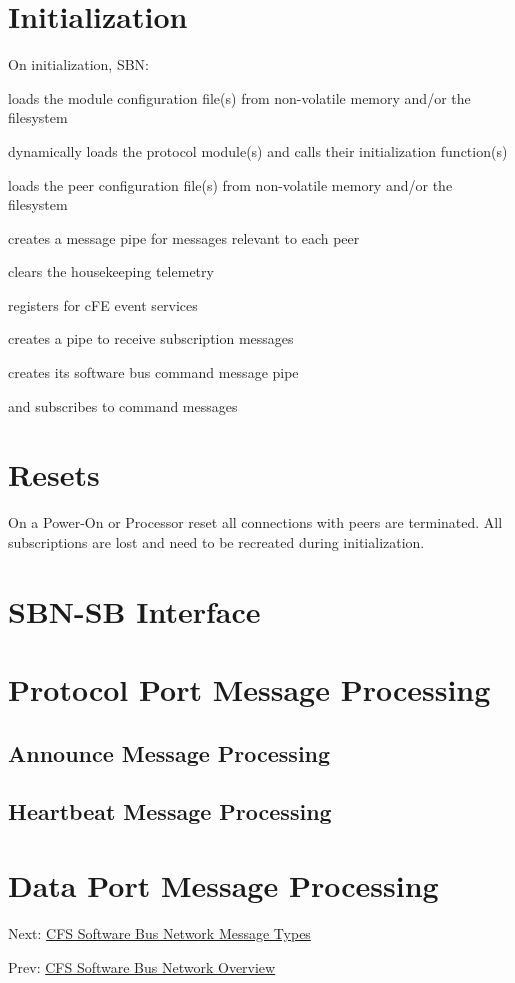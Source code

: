 \section*{Initialization }

On initialization, S\-B\-N\-: 
\begin{DoxyEnumerate}
\item loads the module configuration file(s) from non-\/volatile memory and/or the filesystem 
\item dynamically loads the protocol module(s) and calls their initialization function(s) 
\item loads the peer configuration file(s) from non-\/volatile memory and/or the filesystem 
\item creates a message pipe for messages relevant to each peer 
\item clears the housekeeping telemetry 
\item registers for c\-F\-E event services 
\item creates a pipe to receive subscription messages 
\item creates its software bus command message pipe 
\item and subscribes to command messages

\section*{Resets}



On a Power-\/\-On or Processor reset all connections with peers are terminated. All subscriptions are lost and need to be recreated during initialization.

\section*{S\-B\-N-\/\-S\-B Interface}



 \section*{Protocol Port Message Processing}

\subsection*{Announce Message Processing}

 \subsection*{Heartbeat Message Processing}

 \section*{Data Port Message Processing}

 Next\-: \hyperlink{cfssbnmsgs}{C\-F\-S Software Bus Network Message Types} \par
 Prev\-: \hyperlink{cfssbnovr}{C\-F\-S Software Bus Network Overview} 
\end{DoxyEnumerate}
